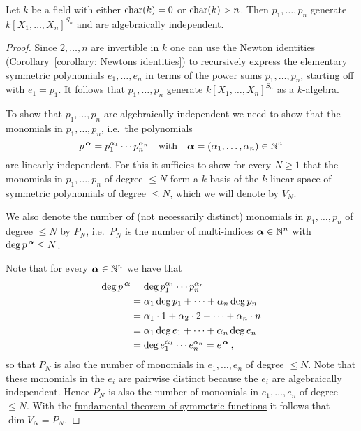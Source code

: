 \begin{theorem}
  Let $k$ be a field with either $\operatorname{char}(k) = 0$ or $\operatorname{char}(k) > n$.
  Then $p_1, \dotsc, p_n$ generate $k[X_1, \dotsc, X_n]^{S_n}$ and are algebraically independent.
\end{theorem}
\begin{proof}
  Since $2, \dotsc, n$ are invertible in $k$ one can use the Newton identities (Corollary~\ref{corollary: Newtons identities}) to recursively express the elementary symmetric polynomials $e_1, \dotsc, e_n$ in terms of the power sums $p_1, \dotsc, p_n$, starting off with $e_1 = p_1$.
  It follows that $p_1, \dotsc, p_n$ generate $k[X_1, \dotsc, X_n]^{S_n}$ as a $k$-algebra.
  
  To show that $p_1, \dotsc, p_n$ are algebraically independent we need to show that the monomials in $p_1, \dotsc, p_n$, i.e.\ the polynomials
  \[
      p^{\,\bm{\alpha}}
    = p_1^{\alpha_1} \dotsm p_n^{\alpha_n}
    \quad\text{with}\quad
        \bm{\alpha}
    =   (\alpha_1, \dotsc, \alpha_n)
    \in \mathbb{N}^n
  \]
  are linearly independent.
  For this it sufficies to show for every $N \geq 1$ that the monomials in $p_1, \dotsc, p_n$ of degree $\leq N$ form a $k$-basis of the $k$-linear space of symmetric polynomials of degree $\leq N$, which we will denote by $V_N$.
  
  We also denote the number of (not necessarily distinct) monomials in $p_1, \dotsc, p_n$ of degree $\leq N$ by $P_N$, i.e.\ $P_N$ is the number of multi-indices $\bm{\alpha} \in \mathbb{N}^n$ with $\deg p^{\,\bm{\alpha}} \leq N$.
  
  Note that for every $\bm{\alpha} \in \mathbb{N}^n$ we have that
  \begin{align*}
        \deg p^{\,\bm{\alpha}}
    &=  \deg
        p_1^{\alpha_1}
        \dotsm 
        p_n^{\alpha_n} \\
    &=    \alpha_1 \deg p_1
        + \dotsb 
        + \alpha_n \deg p_n \\
    &=    \alpha_1 \cdot 1
        + \alpha_2 \cdot 2
        + \dotsb
        + \alpha_n \cdot n  \\
    &=    \alpha_1 \deg e_1
        + \dotsb 
        + \alpha_n \deg e_n \\
    &=  \deg
        e_1^{\alpha_1}
        \dotsm 
        e_n^{\alpha_n}
     =  e^{\,\bm{\alpha}} \,,
  \end{align*}
  so that $P_N$ is also the number of monomials in $e_1, \dotsc, e_n$ of degree $\leq N$.
  Note that these monomials in the $e_i$ are pairwise distinct because the $e_i$ are algebraically independent.
  Hence $P_N$ is also the number of monomials in $e_1, \dotsc, e_n$ of degree $\leq N$.
  With the \hyperref[theorem: fundamental theorem of symmetric functions]{fundamental theorem of symmetric functions} it follows that $\dim V_N = P_N$.
  

\end{proof}
